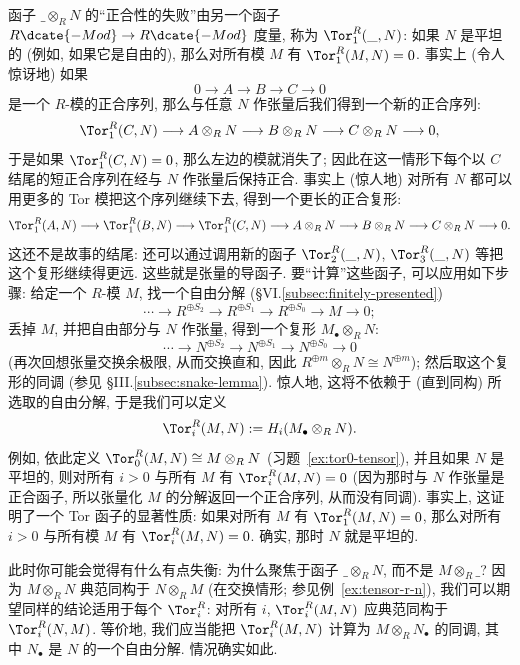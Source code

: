 函子 $\_\otimes_R N$ 的``正合性的失败''由另一个函子 $R\dcate{-Mod}\to R\dcate{-Mod}$ 度量, 称为 $\Tor_1^R(\_,N)$: 如果 $N$ 是平坦的 (例如, 如果它是自由的), 那么对所有模 $M$ 有 $\Tor_1^R(M,N)=0$. 事实上 (令人惊讶地) 如果
\[
0\longrightarrow A\longrightarrow B\longrightarrow C\longrightarrow 0
\]
是一个 $R$-模的正合序列, 那么与任意 $N$ 作张量后我们得到一个新的正合序列:
\[
\Tor_1^R(C,N)\longrightarrow A\otimes_R N\longrightarrow B\otimes_R N\longrightarrow C\otimes_R N\longrightarrow 0,
\]
于是如果 $\Tor_1^R(C,N)=0$, 那么左边的模就消失了; 因此在这一情形下每个以 $C$ 结尾的短正合序列在经与 $N$ 作张量后保持正合. 事实上 (惊人地) 对所有 $N$ 都可以用更多的 Tor 模把这个序列继续下去, 得到一个更长的正合复形:
\[
\Tor_1^R(A,N)\longrightarrow\Tor_1^R(B,N)\longrightarrow\Tor_1^R(C,N)\longrightarrow A\otimes_R N\longrightarrow B\otimes_R N\longrightarrow C\otimes_R N\longrightarrow 0.
\]
这还不是故事的结尾: 还可以通过调用新的函子 $\Tor_2^R(\_,N)$, $\Tor_3^R(\_,N)$ 等把这个复形继续得更远. 这些就是张量的导函子. 要``计算''这些函子, 可以应用如下步骤: 给定一个 $R$-模 $M$, 找一个自由分解 (§VI.\ref{subsec:finitely-presented})
\[
\cdots\longrightarrow R^{\oplus S_2}\longrightarrow R^{\oplus S_1}\longrightarrow R^{\oplus S_0}\longrightarrow M\longrightarrow 0;
\]
丢掉 $M$, 并把自由部分与 $N$ 作张量, 得到一个复形 $M_\bullet\otimes_R N$:
\[
\cdots\longrightarrow N^{\oplus S_2}\longrightarrow N^{\oplus S_1}\longrightarrow N^{\oplus S_0}\longrightarrow 0
\]
(再次回想张量交换余极限, 从而交换直和, 因此 $R^{\oplus m}\otimes_R N\cong N^{\oplus m}$); 然后取这个复形的同调 (参见 §III.\ref{subsec:snake-lemma}). 惊人地, 这将不依赖于 (直到同构) 所选取的自由分解, 于是我们可以定义
\[
\Tor_i^R(M,N):=H_i(M_\bullet\otimes_R N).
\]
例如, 依此定义 $\Tor_0^R(M,N)\cong M\otimes_R N$ (习题~\ref{ex:tor0-tensor}), 并且如果 $N$ 是平坦的, 则对所有 $i>0$ 与所有 $M$ 有 $\Tor_i^R(M,N)=0$ (因为那时与 $N$ 作张量是正合函子, 所以张量化 $M$ 的分解返回一个正合序列, 从而没有同调). 事实上, 这证明了一个 Tor 函子的显著性质: 如果对所有 $M$ 有 $\Tor_1^R(M,N)=0$, 那么对所有 $i>0$ 与所有模 $M$ 有 $\Tor_i^R(M,N)=0$. 确实, 那时 $N$ 就是平坦的.

此时你可能会觉得有什么有点失衡: 为什么聚焦于函子 $\_\otimes_R N$, 而不是 $M\otimes_R\_$? 因为 $M\otimes_R N$ 典范同构于 $N\otimes_R M$ (在交换情形; 参见例~\ref{ex:tensor-r-n}), 我们可以期望同样的结论适用于每个 $\Tor_i^R$: 对所有 $i$, $\Tor_i^R(M,N)$ 应典范同构于 $\Tor_i^R(N,M)$. 等价地, 我们应当能把 $\Tor_i^R(M,N)$ 计算为 $M\otimes_R N_\bullet$ 的同调, 其中 $N_\bullet$ 是 $N$ 的一个自由分解. 情况确实如此.

